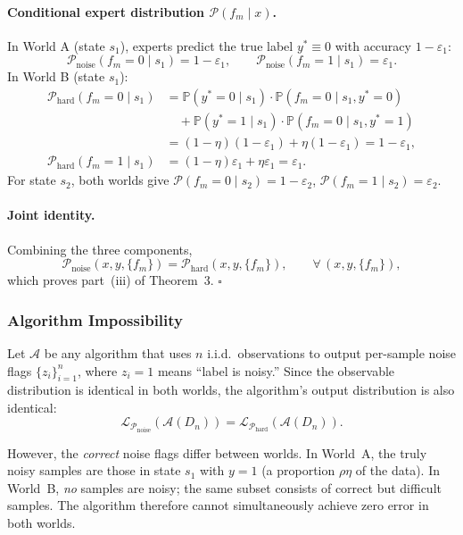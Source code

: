 \paragraph{Conditional expert distribution $\mathcal{P}(f_m\mid x)$.}
In World A (state $s_1$), experts predict the true label $y^*\equiv0$ with
accuracy $1-\varepsilon_1$:
\[
\mathcal{P}_{\text{noise}}(f_m=0\mid s_1)=1-\varepsilon_1,\qquad
\mathcal{P}_{\text{noise}}(f_m=1\mid s_1)=\varepsilon_1.
\]
In World B (state $s_1$):
\[
\begin{aligned}
\mathcal{P}_{\text{hard}}(f_m=0\mid s_1)
&= \mathbb{P}(y^*=0\mid s_1)\cdot\mathbb{P}(f_m=0\mid s_1,y^*=0)\\
&\quad + \mathbb{P}(y^*=1\mid s_1)\cdot\mathbb{P}(f_m=0\mid s_1,y^*=1)\\
&= (1-\eta)(1-\varepsilon_1) + \eta(1-\varepsilon_1) = 1-\varepsilon_1,\\[4pt]
\mathcal{P}_{\text{hard}}(f_m=1\mid s_1)
&= (1-\eta)\varepsilon_1 + \eta\varepsilon_1 = \varepsilon_1.
\end{aligned}
\]
For state $s_2$, both worlds give $\mathcal{P}(f_m=0\mid s_2)=1-\varepsilon_2$,
$\mathcal{P}(f_m=1\mid s_2)=\varepsilon_2$.

\paragraph{Joint identity.}
Combining the three components,
\[
\mathcal{P}_{\text{noise}}(x,y,\{f_m\})
= \mathcal{P}_{\text{hard}}(x,y,\{f_m\}),
\qquad \forall\,(x,y,\{f_m\}),
\]
which proves part~(iii) of Theorem~3. \hfill$\square$

\subsubsection{Algorithm Impossibility}
\label{sec:thm3_impossibility}

Let $\mathcal{A}$ be any algorithm that uses $n$ i.i.d.\ observations to
output per-sample noise flags $\{z_i\}_{i=1}^n$, where $z_i=1$ means ``label
is noisy.''  Since the observable distribution is identical in both worlds,
the algorithm's output distribution is also identical:
\[
\mathcal{L}_{\mathcal{P}_{\text{noise}}}(\mathcal{A}(D_n))
= \mathcal{L}_{\mathcal{P}_{\text{hard}}}(\mathcal{A}(D_n)).
\]

However, the \emph{correct} noise flags differ between worlds.  In World~A,
the truly noisy samples are those in state $s_1$ with $y=1$ (a proportion
$\rho\eta$ of the data).  In World~B, \emph{no} samples are noisy; the same
subset consists of correct but difficult samples.  The algorithm therefore
cannot simultaneously achieve zero error in both worlds.

